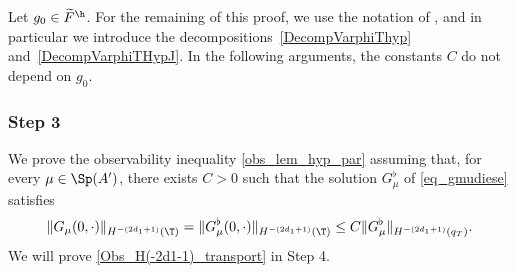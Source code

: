 Let $g_0 \in \widetilde F^\h$. For the remaining of this proof, we use the notation of , and in particular we introduce the decompositions~\eqref{DecompVarphiThyp} and~\eqref{DecompVarphiTHypJ}. In the following arguments, the constants $C$ do not depend on $g_0$.

\subsubsection*{Step 3}
We prove the observability inequality \eqref{obs_lem_hyp_par} assuming that, for every $\mu \in \Sp(A')$, there exists $C>0$ such that the solution $G_\mu^\flat$ of \eqref{eq_gmudiese} satisfies
\begin{equation} \label{Obs_H(-2d1-1)_transport}
\|G_{\mu}(0,\cdot)\|_{H^{-(2d_1+1)}(\T)} = \|G_{\mu}^\flat(0,\cdot)\|_{H^{-(2d_1+1)}(\T)} \leq C \|G_\mu^\flat \|_{H^{-(2d_1+1)}(q_T)}.
\end{equation}
We will prove \eqref{Obs_H(-2d1-1)_transport} in Step 4.


